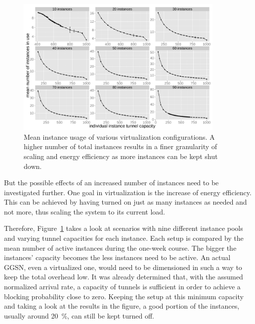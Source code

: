 \begin{figure}[htb]
	\centering
	\includegraphics[width=0.9\textwidth]{images/R-virtualized-mean-instanceusage.pdf}
	\caption{Mean instance usage of various virtualization configurations. A higher number of total instances results in a finer granularity of scaling and energy efficiency as more instances can be kept shut down.}
 \label{c4:fig:res-instance-usage-mean}
\end{figure}

But the possible effects of an increased number of instances need to be investigated further. One goal in virtualization is the increase of energy efficiency. This can be achieved by having turned on just as many instances as needed and not more, thus scaling the system to its current load. 

Therefore, Figure~\ref{c4:fig:res-instance-usage-mean} takes a look at scenarios with nine different instance pools and varying tunnel capacities for each instance. Each setup is compared by the mean number of active instances during the one-week course. The bigger the instances' capacity becomes the less instances need to be active. An actual \gls{GGSN}, even a virtualized one, would need to be dimensioned in such a way to keep the total overhead low. It was already determined that, with the assumed normalized arrival rate, a capacity of  tunnels is sufficient in order to achieve a blocking probability close to zero. Keeping the setup at this minimum capacity and taking a look at the results in the figure, a good portion of the instances, usually around \SI{20}{\percent}, can still be kept turned off.

